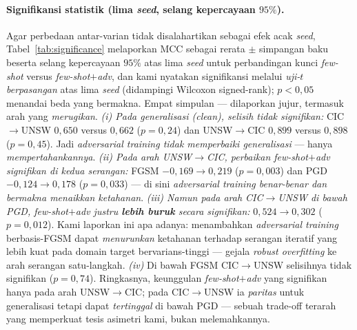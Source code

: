 \documentclass[11pt,a4paper]{article}
\begin{document}
\paragraph{Signifikansi statistik (lima \emph{seed}, selang kepercayaan $95\%$).}
Agar perbedaan antar-varian tidak disalahartikan sebagai efek acak \emph{seed},
Tabel~\ref{tab:significance} melaporkan MCC sebagai rerata $\pm$ simpangan baku
beserta selang kepercayaan $95\%$ atas lima \emph{seed} untuk perbandingan kunci
\emph{few-shot} versus \emph{few-shot$+$adv}, dan kami nyatakan signifikansi melalui
\emph{uji-$t$ berpasangan} atas lima \emph{seed} (didampingi Wilcoxon signed-rank);
$p<0{,}05$ menandai beda yang bermakna. Empat simpulan --- dilaporkan jujur,
termasuk arah yang \emph{merugikan}. \emph{(i) Pada generalisasi (clean), selisih
tidak signifikan:} CIC$\rightarrow$UNSW $0{,}650$ versus $0{,}662$ ($p{=}0{,}24$) dan
UNSW$\rightarrow$CIC $0{,}899$ versus $0{,}898$ ($p{=}0{,}45$). Jadi
\emph{adversarial training tidak memperbaiki generalisasi} --- hanya
\emph{mempertahankannya}. \emph{(ii) Pada arah UNSW$\rightarrow$CIC, perbaikan
few-shot$+$adv signifikan di kedua serangan:} FGSM $-0{,}169\rightarrow0{,}219$
($p{=}0{,}003$) dan PGD $-0{,}124\rightarrow0{,}178$ ($p{=}0{,}033$) --- di sini
\emph{adversarial training benar-benar dan bermakna menaikkan ketahanan}.
\emph{(iii) Namun pada arah CIC$\rightarrow$UNSW di bawah PGD, few-shot$+$adv justru
\textbf{lebih buruk} secara signifikan:} $0{,}524\rightarrow0{,}302$ ($p{=}0{,}012$).
Kami laporkan ini apa adanya: menambahkan \emph{adversarial training} berbasis-FGSM
dapat \emph{menurunkan} ketahanan terhadap serangan iteratif yang lebih kuat pada
domain target bervarians-tinggi --- gejala \emph{robust overfitting} ke arah serangan
satu-langkah. \emph{(iv)} Di bawah FGSM CIC$\rightarrow$UNSW selisihnya tidak
signifikan ($p{=}0{,}74$). Ringkasnya, keunggulan \emph{few-shot$+$adv} yang
signifikan hanya pada arah UNSW$\rightarrow$CIC; pada CIC$\rightarrow$UNSW ia
\emph{paritas} untuk generalisasi tetapi dapat \emph{tertinggal} di bawah PGD ---
sebuah trade-off terarah yang memperkuat tesis asimetri kami, bukan melemahkannya.
\end{document}
